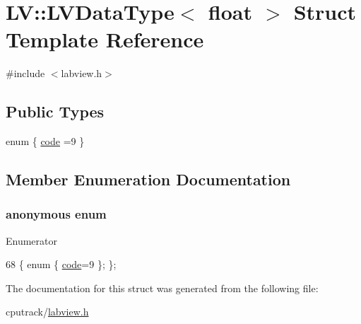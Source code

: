 \hypertarget{struct_l_v_1_1_l_v_data_type_3_01float_01_4}{}\section{LV\+:\+:L\+V\+Data\+Type$<$ float $>$ Struct Template Reference}
\label{struct_l_v_1_1_l_v_data_type_3_01float_01_4}


{\ttfamily \#include $<$labview.\+h$>$}

\subsection*{Public Types}
\begin{DoxyCompactItemize}
\item 
enum \{ \hyperlink{struct_l_v_1_1_l_v_data_type_3_01float_01_4_ac83ac6a989b98b417da8011ef1f45882afcdc92115811ca353ec104a285661ece}{code} =9
 \}
\end{DoxyCompactItemize}


\subsection{Member Enumeration Documentation}
\subsubsection[{\texorpdfstring{anonymous enum}{anonymous enum}}]{\setlength{\rightskip}{0pt plus 5cm}anonymous enum}\hypertarget{struct_l_v_1_1_l_v_data_type_3_01float_01_4_ac83ac6a989b98b417da8011ef1f45882}{}\label{struct_l_v_1_1_l_v_data_type_3_01float_01_4_ac83ac6a989b98b417da8011ef1f45882}
\begin{Desc}
\item[Enumerator]\par
\begin{description}
\item[{\em 
code\hypertarget{struct_l_v_1_1_l_v_data_type_3_01float_01_4_ac83ac6a989b98b417da8011ef1f45882afcdc92115811ca353ec104a285661ece}{}\label{struct_l_v_1_1_l_v_data_type_3_01float_01_4_ac83ac6a989b98b417da8011ef1f45882afcdc92115811ca353ec104a285661ece}
}]\end{description}
\end{Desc}

\begin{DoxyCode}
68 \{ \textcolor{keyword}{enum} \{ \hyperlink{struct_l_v_1_1_l_v_data_type_3_01float_01_4_ac83ac6a989b98b417da8011ef1f45882afcdc92115811ca353ec104a285661ece}{code}=9 \}; \};
\end{DoxyCode}


The documentation for this struct was generated from the following file\+:\begin{DoxyCompactItemize}
\item 
cputrack/\hyperlink{labview_8h}{labview.\+h}\end{DoxyCompactItemize}
